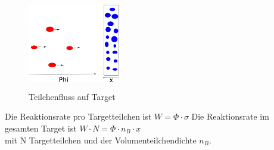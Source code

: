 \documentclass[Ex4_Zusammenfassung.tex]{subfiles}
\begin{document}
\begin{figure}[h]
\includegraphics[height= 4cm, width=4cm]{fluss.png}
\caption{Teilchenfluss auf Target}
\end{figure}
Die Reaktionsrate pro Targetteilchen ist $ W = \Phi \cdot \sigma $ 
Die Reaktionsrate im gesamten Target ist $ W \cdot N = \Phi \cdot n_{B} \cdot x $ \\ 
mit N Targetteilchen und der Volumenteilchendichte $ n_B $. \newline
\end{document}

